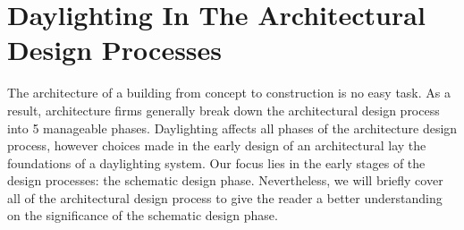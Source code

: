 \section{Daylighting In The Architectural Design Processes}

  The architecture of a building from concept to construction is no easy task.
  As a result, architecture firms generally break down the architectural design process into 5 manageable phases\cite{bazjanac1974architectural}.
  Daylighting affects all phases of the architecture design process, however choices made in the early design of an architectural lay the foundations of a daylighting system.
  Our focus lies in the early stages of the design processes: the schematic design phase.
  Nevertheless, we will briefly cover all of the architectural design process to give the reader a better understanding on the significance of the schematic design phase.

